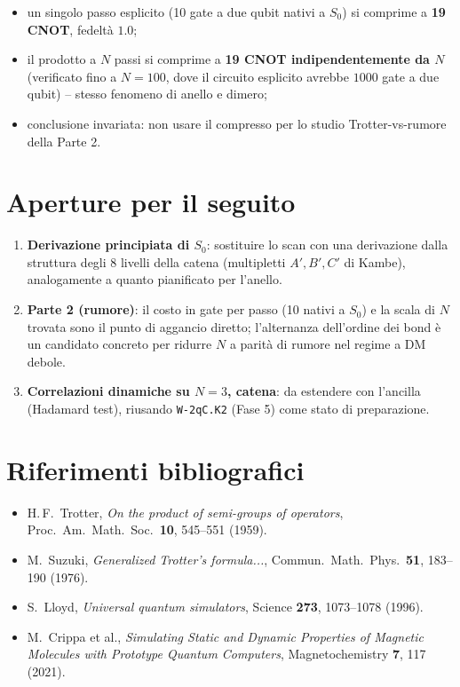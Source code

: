 \documentclass[11pt,a4paper]{article}
\begin{document}
\begin{itemize}
\item un singolo passo esplicito (10 gate a due qubit nativi a $S_0$) si comprime a \textbf{19 CNOT}, fedeltà $1.0$;
\item il prodotto a $N$ passi si comprime a \textbf{19 CNOT indipendentemente da $N$} (verificato fino a $N=100$, dove il circuito esplicito avrebbe $1000$ gate a due qubit) -- stesso fenomeno di anello e dimero;
\item conclusione invariata: non usare il compresso per lo studio Trotter-vs-rumore della Parte 2.
\end{itemize}

\section{Aperture per il seguito}

\begin{enumerate}
\item \textbf{Derivazione principiata di $S_0$}: sostituire lo scan con una derivazione dalla struttura degli 8 livelli della catena (multipletti $A',B',C'$ di Kambe), analogamente a quanto pianificato per l'anello.
\item \textbf{Parte 2 (rumore)}: il costo in gate per passo (10 nativi a $S_0$) e la scala di $N$ trovata sono il punto di aggancio diretto; l'alternanza dell'ordine dei bond è un candidato concreto per ridurre $N$ a parità di rumore nel regime a DM debole.
\item \textbf{Correlazioni dinamiche su $N=3$, catena}: da estendere con l'ancilla (Hadamard test), riusando \texttt{W-2qC.K2} (Fase 5) come stato di preparazione.
\end{enumerate}

\section*{Riferimenti bibliografici}

\begin{itemize}
\item H.\,F.\ Trotter, \emph{On the product of semi-groups of operators}, Proc.\ Am.\ Math.\ Soc.\ \textbf{10}, 545--551 (1959).
\item M.\ Suzuki, \emph{Generalized Trotter's formula...}, Commun.\ Math.\ Phys.\ \textbf{51}, 183--190 (1976).
\item S.\ Lloyd, \emph{Universal quantum simulators}, Science \textbf{273}, 1073--1078 (1996).
\item M.\ Crippa et al., \emph{Simulating Static and Dynamic Properties of Magnetic Molecules with Prototype Quantum Computers}, Magnetochemistry \textbf{7}, 117 (2021).
\end{itemize}
\end{document}
